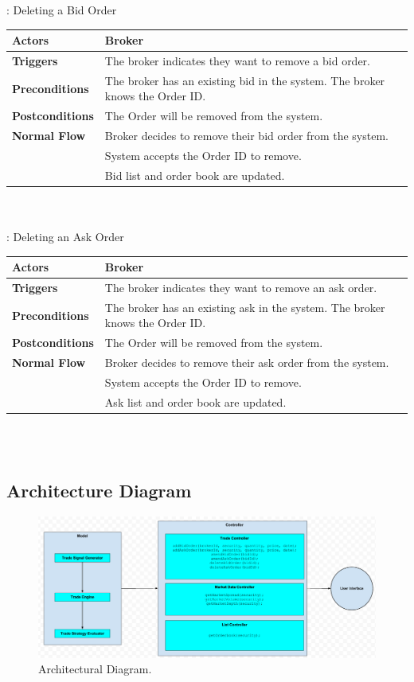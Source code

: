 \documentclass[a4paper]{article}
\begin{document}
: Deleting a Bid Order \\ 
\begin{tabular}{ | l | p{10cm} |}\hline
	{\bf Actors} & Broker \\\hline
	{\bf Triggers} & The broker indicates they want to remove a bid order. \\\hline
	{\bf Preconditions} & The broker has an existing bid in the system. The broker knows the Order ID. \\\hline
	{\bf Postconditions} & The Order will be removed from the system. \\\hline
	{\bf Normal Flow} & Broker decides to remove their bid order from the system. \\
	& System accepts the Order ID to remove. \\
	& Bid list and order book are updated.  \\\hline
\end{tabular} \\\\

: Deleting an Ask Order \\ 
\begin{tabular}{ | l | p{10cm} |}\hline
	{\bf Actors} & Broker \\\hline
	{\bf Triggers} & The broker indicates they want to remove an ask order. \\\hline
	{\bf Preconditions} & The broker has an existing ask in the system. The broker knows the Order ID. \\\hline
	{\bf Postconditions} & The Order will be removed from the system.  \\\hline
	{\bf Normal Flow} & Broker decides to remove their ask order from the system. \\
	& System accepts the Order ID to remove. \\
	& Ask list and order book are updated. \\\hline
\end{tabular} \\\\

\begin {landscape}
\section {Architecture Diagram}
\begin{figure}[H]
  \centering
    \includegraphics[width=1.6\textwidth]{images/ADiagram}
     \caption{Architectural Diagram.}
\end{figure}
\end {landscape}
\end{document}
